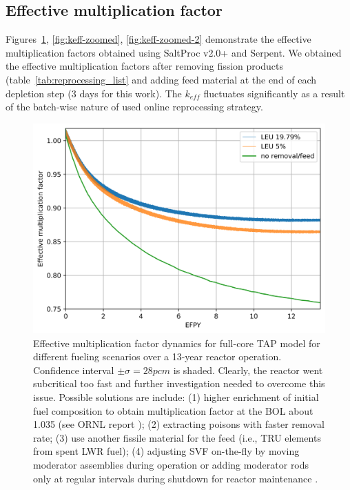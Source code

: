 \documentclass[12pt]{article} %
\begin{document}
\subsection{Effective multiplication factor}
Figures~\ref{fig:keff}, \ref{fig:keff-zoomed}, \ref{fig:keff-zoomed-2} demonstrate 
the effective 
multiplication factors  obtained using SaltProc v2.0+ and Serpent. We obtained 
the effective multiplication factors after removing fission products 
(table~\ref{tab:reprocessing_list} and adding feed material at the end of each 
depletion step (3 days for this work). The $k_{eff}$ fluctuates significantly as a result of the batch-wise nature of used online reprocessing strategy.
\begin{figure}[htp!] %
		  \includegraphics[width=1.05\textwidth]{keff_3.png}
	\vspace{-0.5in}
  \caption{Effective multiplication factor dynamics for full-core
   \gls{TAP} model for different fueling scenarios over a 13-year reactor operation. 
   Confidence interval $\pm\sigma=28pcm$ is shaded. Clearly, the reactor went 
   subcritical too fast and further investigation needed to overcome this issue. 
   Possible solutions are include: (1) higher enrichment of initial fuel composition to 
   obtain multiplication factor at the \gls{BOL} about 1.035 (see \gls{ORNL} report 
   \cite{betzler_assessment_2017}); (2) extracting poisons with faster removal rate;
   (3) use another fissile material for the feed (i.e., \gls{TRU} elements from spent 
   \gls{LWR} fuel); (4) adjusting \gls{SVF} on-the-fly by 
   moving moderator assemblies during operation 
   \cite{transatomic_power_corporation_technical_2016} or adding moderator rods 
   only at regular intervals during shutdown for reactor maintenance  \cite{betzler_fuel_2018}.}
  \label{fig:keff}
\end{figure}
\end{document}
